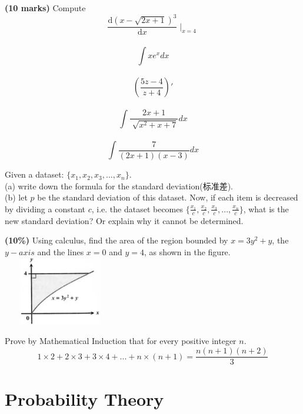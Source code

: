 \documentclass{article}
\begin{document}
\vspace{3\baselineskip}

\noindent \textbf{(10 marks)} Compute 
$$ \frac{\mathrm{d} (x-\sqrt{2x + 1} )^3}{\mathrm{d} x} \mid _{x=4} $$ \\
$$ \int xe^x dx $$ \\
$$ ({\frac{5z-4}{z+4} })' $$ \\
$$ \int \frac{2x+1}{\sqrt[]{x^2 + x + 7}}dx $$ \\
$$ \int \frac{7}{{(2x+1)(x-3)}}dx $$ 

\vspace{3\baselineskip}

\noindent Given a dataset: $\{x_1, x_2, x_3,...,x_n\}$.\\
(a) write down the formula for the standard deviation(标准差).\\
(b) let $p$ be the standard deviation of this dataset. Now, if each item is decreased by dividing a constant $c$, i.e. the dataset becomes $\{\frac{x_1}{c}, \frac{x_2}{c}, \frac{x_3}{c},...,\frac{x_n}{c}\}$, what is the new standard deviation? Or explain why it cannot be determined.

\vspace{3\baselineskip}

\noindent \textbf{(10\%)} Using calculus, find the area of the region bounded by $x = 3y^2+y$, the $y-axis$ and the lines $x=0$ and $y = 4$, as shown in the figure.\\

\hfill
\includegraphics[width=5cm, height=3cm]{graph2.png}

\vspace{3\baselineskip}

\noindent Prove by Mathematical Induction that for every positive integer $n$.
$$1\times2+2\times3+3\times4+...+n\times(n+1) = \frac{n(n+1)(n+2)}{3}$$

\vspace{6\baselineskip}


\section{Probability Theory}
\end{document}
